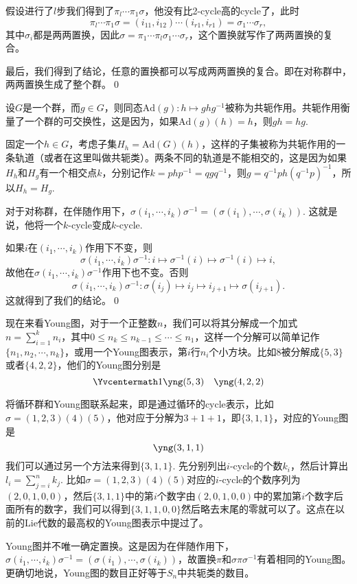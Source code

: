 \documentclass[9pt]{extarticle}
\begin{document}
假设进行了$l$步我们得到了$\pi_l\cdots\pi_1 \sigma$，他没有比2-cycle高的cycle了，此时
\[
\pi_l\cdots\pi_1 \sigma=(i_{11},i_{12}) \cdots  (i_{r1},i_{r1})=\sigma_1 \cdots  \sigma_r,
\]
其中$\sigma_i$都是两两置换，因此$\sigma=\pi_1\cdots\pi_l\sigma_1\cdots \sigma_r$，这个置换就写作了两两置换的复合。

最后，我们得到了结论，任意的置换都可以写成两两置换的复合。即在对称群中，两两置换生成了整个群。\qed

\para 设$G$是一个群，而$g\in G$，则同态$\mathrm{Ad}(g):h\mapsto ghg^{-1}$被称为共轭作用。共轭作用衡量了一个群的可交换性，这是因为，如果$\mathrm{Ad}(g)(h)=h$，则$gh=hg$.

固定一个$h\in G$，考虑子集$H_h=\mathrm{Ad}(G)(h)$，这样的子集被称为共轭作用的一条轨道（或者在这里叫做共轭类）。两条不同的轨道是不能相交的，这是因为如果$H_h$和$H_g$有一个相交点$k$，分别记作$k=php^{-1}=qgq^{-1}$，则$g=q^{-1}ph(q^{-1}p)^{-1}$，所以$H_h=H_g$.

\pro 对于对称群，在伴随作用下，$\sigma (i_1,\cdots,i_k)\sigma^{-1}= (\sigma(i_1),\cdots,\sigma(i_k))$. 
这就是说，他将一个$k$-cycle变成$k$-cycle.

\proof 如果$i$在$(i_1,\cdots,i_k)$作用下不变，则
\[\sigma (i_1,\cdots,i_k)\sigma^{-1}:i\mapsto \sigma^{-1}(i)\mapsto \sigma^{-1}(i) \mapsto i,\]
故他在$\sigma (i_1,\cdots,i_k)\sigma^{-1}$作用下也不变。否则
\[
	\sigma (i_1,\cdots,i_k)\sigma^{-1}:\sigma(i_j)\mapsto i_j\mapsto i_{j+1} \mapsto \sigma(i_{j+1}).
\]
这就得到了我们的结论。\qed

\para 现在来看Young图，对于一个正整数$n$，我们可以将其分解成一个加式$n=\sum_{i=1}^k n_i$，其中$0\leq n_k\leq n_{k-1}\leq \cdots \leq n_1$，这样一个分解可以简单记作$\{n_1,n_2,\cdots,n_k\}$，或用一个Young图表示，第$i$行$n_i$个小方块。比如$8$被分解成$\{5,3\}$或者$\{4,2,2\}$，他们的Young图分别是
\[\Yvcentermath1
	\yng(5,3)\quad \yng(4,2,2)
\]

将循环群和Young图联系起来，即是通过循环的cycle表示，比如$\sigma=(1,2,3)(4)(5)$，他对应于分解为$3+1+1$，即$\{3,1,1\}$，对应的Young图是
\[
	\yng(3,1,1)
\]
我们可以通过另一个方法来得到$\{3,1,1\}$. 先分别列出$i$-cycle的个数$k_i$，然后计算出$l_i=\sum_{j=i}^nk_j$. 比如$\sigma=(1,2,3)(4)(5)$对应的$i$-cycle的个数序列为$(2,0,1,0,0)$，然后$\{3,1,1\}$中的第$i$个数字由$(2,0,1,0,0)$中的累加第$i$个数字后面所有的数字，我们可以得到$\{3,1,1,0,0\}$然后略去末尾的零就可以了。这点在以前的Lie代数的最高权的Young图表示中提过了。

Young图并不唯一确定置换。这是因为在伴随作用下，$\sigma (i_1,\cdots,i_k)\sigma^{-1}= (\sigma(i_1),\cdots,\sigma(i_k))$，故置换$\pi$和$\sigma\pi\sigma^{-1}$有着相同的Young图。更确切地说，Young图的数目正好等于$S_n$中共轭类的数目。
\end{document}
